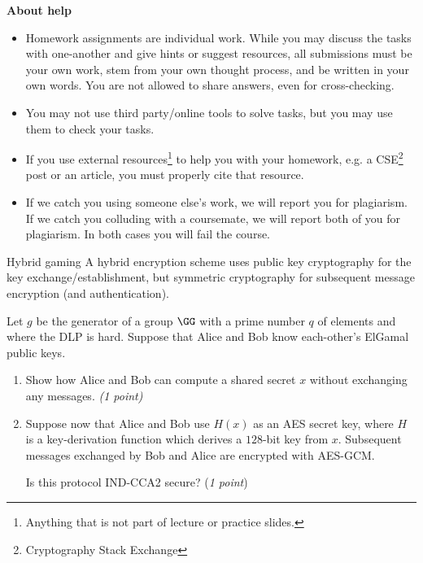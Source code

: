 \documentclass{homework}
\begin{document}
\textbf{About help}
\begin{itemize}
  \item Homework assignments are individual work.
  While you may discuss the tasks with one-another and give hints or suggest resources, all submissions must be your own work, stem from your own thought process, and be written in your own words.
  You are not allowed to share answers, even for cross-checking.
  \item You may not use third party/online tools to solve tasks, but you may use them to check your tasks.
  \item If you use external resources\footnote{Anything that is not part of lecture or practice slides.} to help you with your homework, e.g. a CSE\footnote{Cryptography Stack Exchange} post or an article, you must properly cite that resource.
  \item If we catch you using someone else's work, we will report you for plagiarism.
  If we catch you colluding with a coursemate, we will report both of you for plagiarism.
  In both cases you will fail the course.
\end{itemize}

\newpage

\begin{task}{Hybrid gaming}
  A hybrid encryption scheme uses public key cryptography for the key exchange/establishment, but symmetric cryptography for subsequent message encryption (and authentication).

  Let $g$ be the generator of a group $\GG$ with a prime number $q$ of elements and where the DLP is hard.
  Suppose that Alice and Bob know each-other's ElGamal public keys.
  
  \begin{enumerate}
    \item Show how Alice and Bob can compute a shared secret $x$ without exchanging any messages. \textit{(1 point)}
    \item Suppose now that Alice and Bob use $H(x)$ as an AES secret key, where $H$ is a key-derivation function which derives a $128$-bit key from $x$.
    Subsequent messages exchanged by Bob and Alice are encrypted with AES-GCM.

    Is this protocol IND-CCA2 secure? (\textit{1 point})
  \end{enumerate}
\end{task}
\end{document}
